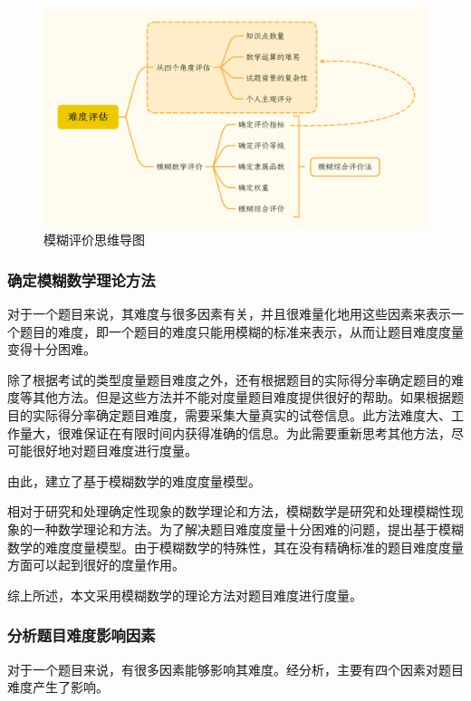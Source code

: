 \begin{figure}[h]
    \centering
    \includegraphics[scale=0.3]{res/figure040041.png}
    \caption{模糊评价思维导图}
\end{figure}

\subsubsection{确定模糊数学理论方法}

对于一个题目来说，其难度与很多因素有关，并且很难量化地用这些因素来表示一个题目的难度，即一个题目的难度只能用模糊的标准来表示，从而让题目难度度量变得十分困难。

除了根据考试的类型度量题目难度之外，还有根据题目的实际得分率确定题目的难度等其他方法。但是这些方法并不能对度量题目难度提供很好的帮助。如果根据题目的实际得分率确定题目难度，需要采集大量真实的试卷信息。此方法难度大、工作量大，很难保证在有限时间内获得准确的信息。为此需要重新思考其他方法，尽可能很好地对题目难度进行度量。

由此，建立了基于模糊数学的难度度量模型。

相对于研究和处理确定性现象的数学理论和方法，模糊数学是研究和处理模糊性现象的一种数学理论和方法\cite{MoHuShuXue}。为了解决题目难度度量十分困难的问题，提出基于模糊数学的难度度量模型。由于模糊数学的特殊性，其在没有精确标准的题目难度度量方面可以起到很好的度量作用。

综上所述，本文采用模糊数学的理论方法对题目难度进行度量。

\subsubsection{分析题目难度影响因素}

对于一个题目来说，有很多因素能够影响其难度。经分析，主要有四个因素对题目难度产生了影响。

